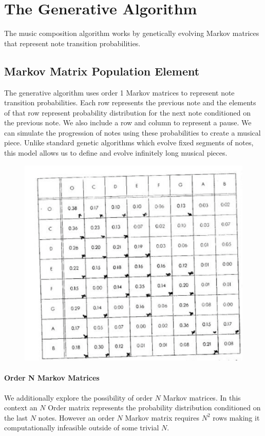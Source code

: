 \documentclass{article}
\begin{document}
\section{The Generative Algorithm}

The music composition algorithm works by genetically evolving Markov matrices that represent note transition probabilities.

\subsection{Markov Matrix Population Element}

The generative algorithm uses order 1 Markov matrices to represent note transition probabilities. Each row represents the previous note and the elements of that row represent probability distribution for the next note conditioned on the previous note. We also include a row and column to represent a pause. We can simulate the progression of notes using these probabilities to create a musical piece. Unlike standard genetic algorithms which evolve fixed segments of notes, this model allows us to define and evolve infinitely long musical pieces.


\begin{figure}[H]
\centering
\includegraphics[width=0.66\linewidth]{../graphs/matrix.png}
\end{figure}

\paragraph{Order N Markov Matrices} We additionally explore the possibility of order $N$ Markov matrices. In this context an $N$ Order matrix represents the probability distribution conditioned on the last $N$ notes. However an order $N$ Markov matrix requires $N^2$ rows making it computationally infeasible outside of some trivial $N$.
\end{document}
